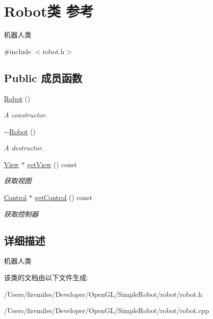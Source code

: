 \hypertarget{class_robot}{}\section{Robot类 参考}
\label{class_robot}


机器人类  




{\ttfamily \#include $<$robot.\+h$>$}

\subsection*{Public 成员函数}
\begin{DoxyCompactItemize}
\item 
\hypertarget{class_robot_a4fc7c70ae20623f05e06f2ecb388b6c4}{}\hyperlink{class_robot_a4fc7c70ae20623f05e06f2ecb388b6c4}{Robot} ()\label{class_robot_a4fc7c70ae20623f05e06f2ecb388b6c4}

\begin{DoxyCompactList}\small\item\em A constructor. \end{DoxyCompactList}\item 
\hypertarget{class_robot_a924320124b09c2f2ac1621aa210d5f38}{}\hyperlink{class_robot_a924320124b09c2f2ac1621aa210d5f38}{$\sim$\+Robot} ()\label{class_robot_a924320124b09c2f2ac1621aa210d5f38}

\begin{DoxyCompactList}\small\item\em A destructor. \end{DoxyCompactList}\item 
\hypertarget{class_robot_ab193a0de96d68613c7d39c1ef0e990b9}{}\hyperlink{class_view}{View} $\ast$ \hyperlink{class_robot_ab193a0de96d68613c7d39c1ef0e990b9}{get\+View} () const \label{class_robot_ab193a0de96d68613c7d39c1ef0e990b9}

\begin{DoxyCompactList}\small\item\em 获取视图 \end{DoxyCompactList}\item 
\hypertarget{class_robot_af3bd8421f9b7f28bfd054b47ba8475aa}{}\hyperlink{class_control}{Control} $\ast$ \hyperlink{class_robot_af3bd8421f9b7f28bfd054b47ba8475aa}{get\+Control} () const \label{class_robot_af3bd8421f9b7f28bfd054b47ba8475aa}

\begin{DoxyCompactList}\small\item\em 获取控制器 \end{DoxyCompactList}\end{DoxyCompactItemize}


\subsection{详细描述}
机器人类 

该类的文档由以下文件生成\+:\begin{DoxyCompactItemize}
\item 
/\+Users/firemiles/\+Developer/\+Open\+G\+L/\+Simple\+Robot/robot/robot.\+h\item 
/\+Users/firemiles/\+Developer/\+Open\+G\+L/\+Simple\+Robot/robot/robot.\+cpp\end{DoxyCompactItemize}
